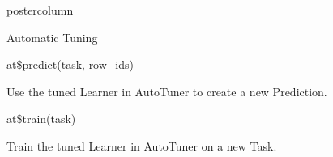 \documentclass{beamer}
\begin{document}
\begin{frame}[fragile]{}
\begin{columns}
\begin{column}{.245\textwidth}
\begin{beamercolorbox}[center]{postercolumn}
\begin{minipage}{.98\textwidth}
{\begin{myblock}{Automatic Tuning}
						\\
						\begin{codebox}
							at\$predict(task, row\_ids)
						\end{codebox}
						Use the tuned Learner in AutoTuner to create a new Prediction.
						\\
						\begin{codebox}
							at\$train(task)
						\end{codebox}
						Train the tuned Learner in AutoTuner on a new Task.
						\end{myblock}
					\vfill}
				\end{minipage}
			\end{beamercolorbox}
		\end{column}
	\end{columns}
\end{frame}
\end{document}
